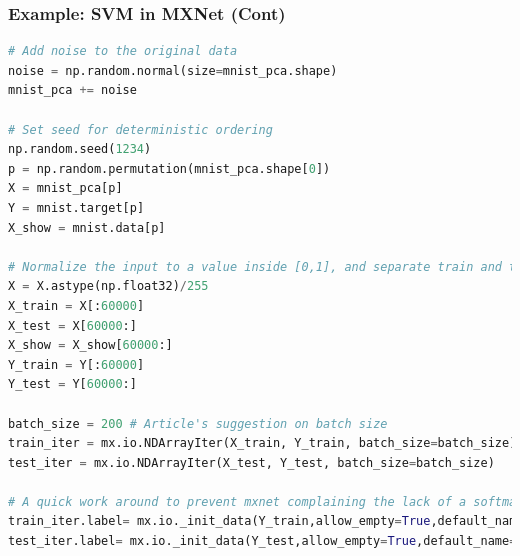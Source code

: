\begin{frame}[fragile]
  \MyLogo
  \frametitle{Example: SVM in MXNet (Cont)}  

\ContinueLineNumber
\scriptsize{
\begin{lstlisting}[language=python]
# Add noise to the original data
noise = np.random.normal(size=mnist_pca.shape)
mnist_pca += noise

# Set seed for deterministic ordering
np.random.seed(1234) 
p = np.random.permutation(mnist_pca.shape[0])
X = mnist_pca[p]
Y = mnist.target[p]
X_show = mnist.data[p]

# Normalize the input to a value inside [0,1], and separate train and test sets
X = X.astype(np.float32)/255
X_train = X[:60000]
X_test = X[60000:]
X_show = X_show[60000:]
Y_train = Y[:60000]
Y_test = Y[60000:]

batch_size = 200 # Article's suggestion on batch size
train_iter = mx.io.NDArrayIter(X_train, Y_train, batch_size=batch_size)
test_iter = mx.io.NDArrayIter(X_test, Y_test, batch_size=batch_size)

# A quick work around to prevent mxnet complaining the lack of a softmax_label
train_iter.label= mx.io._init_data(Y_train,allow_empty=True,default_name='svm_label')
test_iter.label= mx.io._init_data(Y_test,allow_empty=True,default_name='svm_label')

\end{lstlisting}
}
\vskip 100pt

\end{frame}

